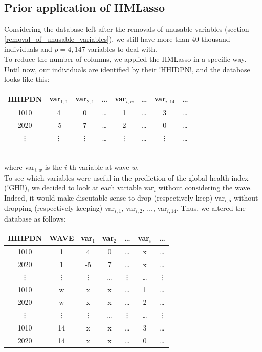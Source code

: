 \documentclass[]{article}
\begin{document}
\subsection{Prior application of HMLasso}
Considering the database left after the removals of unusable variables (section \ref{removal_of_unusable_variables}), we still have more than $40$ thousand individuals and $p=4,147$ variables to deal with.\\
To reduce the number of columns, we applied the HMLasso in a specific way. Until now, our individuals are identified by their \pyth!HHIDPN!, and the database looks like this:
\begin{table}[!h]
\centering
\label{data_03}
\begin{tabular}{|c|c|c|c|c|c|c|c|}
	\hline
	\textbf{HHIPDN} & \textbf{var$_{1,1}$} & \textbf{var$_{2,1}$} & \dots & \textbf{var$_{i,w}$} & \dots & \textbf{var$_{i,14}$} & \dots\\
	\hline
	1010 & 4 & 0 & \dots & 1 & \dots & 3 & \dots\\
	\hline
	2020 & -5 & 7 & \dots & 2 & \dots & 0 & \dots\\
	\hline
	\vdots & \vdots & \vdots & \dots & \vdots & \dots & \vdots & \dots \\
	\hline
\end{tabular}
\end{table}\\
where var$_{i, w}$ is the $i$-th variable at wave $w$.\\
To see which variables were useful in the prediction of the global health index (\pyth!GHI!), we decided to look at each variable var$_i$ without considering the wave. Indeed, it would make discutable sense to drop (respectively keep) var$_{i, 5}$ without dropping (respectively keeping) var$_{i, 1}$, var$_{i, 2}$, $\dots$, var$_{i, 14}$. Thus, we altered the database as follows:\\
\begin{table}[!h]
	\centering
	\label{data_03_lasso}
	\begin{tabular}{|c|c|c|c|c|c|c|}
		\hline
		\textbf{HHIPDN} & \textbf{WAVE} & \textbf{var$_{1}$} & \textbf{var$_{2}$} & \dots & \textbf{var$_{i}$} & \dots\\
		\hline
		1010 & 1 & 4 & 0 & \dots & x & \dots\\
		\hline
		2020 & 1 & -5 & 7 & \dots & x & \dots\\
		\hline
		\vdots & \vdots & \vdots & \dots & \vdots & \dots & \vdots \\
		\hline
		1010 & w & x & x & \dots & 1 & \dots\\
		\hline
		2020 & w & x & x & \dots & 2 & \dots\\
		\hline
		\vdots & \vdots & \vdots & \dots & \vdots & \dots & \vdots \\
		\hline
		1010 & 14 & x & x & \dots & 3 & \dots\\
		\hline
		2020 & 14 & x & x & \dots & 0 & \dots\\
		\hline
	\end{tabular}
\end{table}\\
\end{document}
